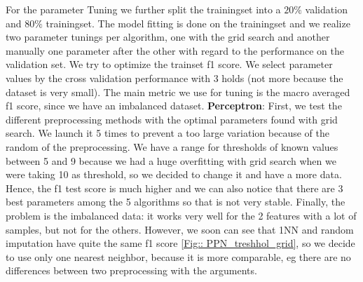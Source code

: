 \documentclass[11pt]{article}
\begin{document}
For the parameter Tuning we further split the trainingset into a $20\%$ validation and $80\%$ trainingset. The model fitting is done on the trainingset and we realize two parameter tunings per algorithm, one with the grid search and another manually one parameter after the other with regard to the performance on the validation set. We try to optimize the trainset f1 score. We select parameter values by the cross validation performance with 3 holds (not more because the dataset is very small). The main metric we use for tuning is the macro averaged f1 score, since we have an imbalanced dataset.
%
\newline
\textbf{Perceptron}: First, we test the different preprocessing methods with the optimal parameters found with grid search. We launch it 5 times to prevent a too large variation because of the random of the preprocessing. We have a range for thresholds of known values between 5 and 9 because we had a huge overfitting with grid search when we were taking 10 as threshold, so we decided to change it and have a more data. Hence, the f1 test score is much higher and we can also notice that there are 3 best parameters among the 5 algorithms so that is not very stable. Finally, the problem is the imbalanced data: it works very well for the 2 features with a lot of samples, but not for the others.
However, we soon can see that 1NN and random imputation have quite the same f1 score \ref{Fig:: PPN_treshhol_grid}, so we decide to use only one nearest neighbor, because it is more comparable, eg there are no differences between two preprocessing with the arguments.
\end{document}
